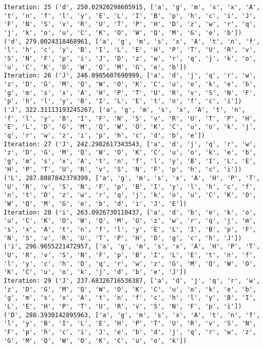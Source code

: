 \documentclass[english,man]{apa6}
\begin{document}
\begin{verbatim}
Iteration: 25 ('d', 250.02920298605915, ['a', 'g', 'm', 's', 'x', 'A', 't', 'n', 'f', 'l', 'y', 'E', 'L', 'I', 'B', 'p', 'h', 'c', 'i', 'J', 'F', 'N', 'S', 'v', 'R', 'U', 'T', 'P', 'H', 'D', 'z', 'w', 'r', 'q', 'j', 'k', 'o', 'u', 'C', 'K', 'O', 'W', 'Q', 'M', 'G', 'e', 'b']) ('d', 279.0024318468961, ['a', 'g', 'm', 's', 'x', 'A', 't', 'n', 'f', 'l', 'h', 'c', 'y', 'B', 'I', 'L', 'E', 'H', 'P', 'T', 'U', 'R', 'v', 'S', 'N', 'F', 'p', 'i', 'J', 'D', 'z', 'w', 'r', 'q', 'j', 'k', 'o', 'u', 'C', 'K', 'O', 'W', 'Q', 'M', 'G', 'e', 'b'])
Iteration: 26 ('J', 246.8985607690999, ['a', 'd', 'j', 'q', 'r', 'w', 'z', 'D', 'G', 'M', 'Q', 'W', 'O', 'K', 'C', 'u', 'o', 'k', 'e', 'b', 'g', 'm', 's', 'x', 'A', 'H', 'P', 'T', 'U', 'R', 'v', 'S', 'N', 'F', 'p', 'h', 'l', 'y', 'B', 'I', 'L', 'E', 't', 'n', 'f', 'c', 'i']) ('J', 322.31113193245267, ['a', 'g', 'm', 's', 'x', 'A', 't', 'n', 'f', 'l', 'y', 'B', 'I', 'F', 'N', 'S', 'v', 'R', 'U', 'T', 'P', 'H', 'E', 'L', 'D', 'G', 'M', 'Q', 'W', 'O', 'K', 'C', 'u', 'o', 'k', 'j', 'q', 'r', 'w', 'z', 'i', 'p', 'h', 'c', 'd', 'b', 'e'])
Iteration: 27 ('J', 242.2982617343543, ['a', 'd', 'j', 'q', 'r', 'w', 'z', 'D', 'G', 'M', 'Q', 'W', 'O', 'K', 'C', 'u', 'o', 'k', 'e', 'b', 'g', 'm', 's', 'x', 'A', 't', 'n', 'f', 'l', 'y', 'B', 'I', 'L', 'E', 'H', 'P', 'T', 'U', 'R', 'v', 'S', 'N', 'F', 'p', 'h', 'c', 'i']) ('L', 287.8087842379399, ['a', 'g', 'm', 's', 'x', 'A', 'H', 'P', 'T', 'U', 'R', 'v', 'S', 'N', 'F', 'p', 'B', 'I', 'y', 'l', 'h', 'c', 'f', 'n', 't', 'D', 'z', 'w', 'r', 'q', 'j', 'k', 'o', 'u', 'C', 'K', 'O', 'W', 'Q', 'M', 'G', 'e', 'b', 'd', 'i', 'J', 'E'])
Iteration: 28 ('i', 263.0926730110437, ['a', 'd', 'b', 'e', 'k', 'o', 'u', 'C', 'K', 'O', 'W', 'Q', 'M', 'G', 'z', 'w', 'r', 'q', 'j', 'm', 's', 'x', 'A', 't', 'n', 'f', 'l', 'y', 'E', 'L', 'I', 'B', 'p', 'F', 'N', 'S', 'v', 'R', 'U', 'T', 'P', 'H', 'D', 'g', 'c', 'h', 'J']) ('i', 296.9655221472957, ['a', 'g', 'm', 's', 'x', 'A', 'H', 'P', 'T', 'U', 'R', 'v', 'S', 'N', 'F', 'p', 'B', 'I', 'L', 'E', 't', 'n', 'f', 'l', 'y', 'c', 'h', 'D', 'q', 'r', 'w', 'z', 'G', 'M', 'Q', 'W', 'O', 'K', 'C', 'u', 'o', 'k', 'j', 'd', 'b', 'e', 'J'])
Iteration: 29 ('J', 237.68326716536387, ['a', 'd', 'j', 'q', 'r', 'w', 'z', 'D', 'G', 'M', 'Q', 'W', 'O', 'K', 'C', 'u', 'o', 'k', 'e', 'b', 'g', 'm', 's', 'x', 'A', 't', 'n', 'f', 'c', 'h', 'l', 'y', 'B', 'I', 'L', 'E', 'H', 'P', 'T', 'U', 'R', 'v', 'S', 'N', 'F', 'p', 'i']) ('D', 288.3930142895963, ['a', 'g', 'm', 's', 'x', 'A', 't', 'n', 'f', 'l', 'y', 'B', 'I', 'L', 'E', 'H', 'P', 'T', 'U', 'R', 'v', 'S', 'N', 'F', 'p', 'h', 'c', 'i', 'J', 'e', 'b', 'd', 'j', 'q', 'r', 'w', 'z', 'G', 'M', 'Q', 'W', 'O', 'K', 'C', 'u', 'o', 'k'])

\end{verbatim}
\end{document}
